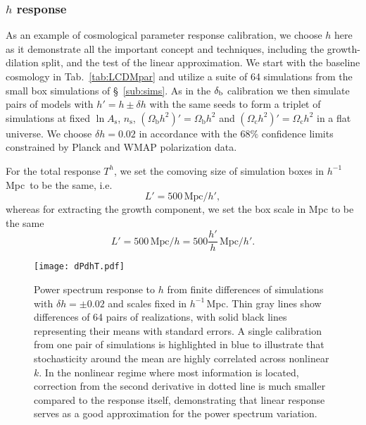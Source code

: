 \documentclass[prd,twocolumn,amsmath,amssymb,floatfix,superscriptaddress]{revtex4-1}
\newcommand{\Omegab}{{\Omega_\textrm{b}}}
\newcommand{\Omegac}{{\Omega_\textrm{c}}}
\newcommand{\lnAs}{{\ln\!A_\textrm{s}}}
\newcommand{\ns}{{n_\textrm{s}}}
\newcommand{\br}{{\rm b}}
\newcommand{\hiMpc}{$h^{-1}\,$Mpc}
\begin{document}
{{\subsubsection{$h$ response}
\label{sub:calibrations}

As an example of cosmological parameter response calibration, we choose
$h$ here as it demonstrate all the important concept and techniques,
including the growth-dilation split, and the test of the linear approximation.
We start with the baseline cosmology in Tab.~\ref{tab:LCDMpar} and  utilize a 
suite
of 64 simulations from the small box simulations of \S~\ref{sub:sims}.
As in the $\delta_\br$ {calibration}
we then simulate  pairs of 
models with  $h'= h\pm\delta h$ with the same seeds to form a triplet of simulations
at fixed  $\lnAs$, $\ns$, $(\Omegab h^2)'= \Omegab h^2$ and $(\Omegac h^2)'=
\Omegac h^2$
in a flat universe.
We choose $\delta h=0.02$ in accordance with the $68\%$ confidence limits
constrained by Planck and WMAP polarization data.


For the total response $T^h$, we set the comoving size of simulation boxes
in \hiMpc\ to be the same, i.e.
\begin{equation}
    L'=500\,\textrm{Mpc}/h',
\end{equation}
whereas for extracting the growth component, we set the box scale in Mpc to be the
same
\begin{equation}
    L'=500\,\textrm{Mpc}/h=500\frac{h'}{h}\,\textrm{Mpc}/h'.
\end{equation}

\begin{figure}[tb]
    \centering
    \texttt{[image: dPdhT.pdf]}
    \caption{
        \footnotesize Power spectrum response to $h$ from finite differences of
        simulations with $\delta h=\pm0.02$ and scales fixed in \hiMpc.
        Thin gray lines show differences of 64 pairs of realizations,
        with solid black lines representing their means with standard errors.
        A single calibration from one pair of simulations is highlighted in blue
        to illustrate that stochasticity around the mean are highly correlated across nonlinear $k$.
        In the nonlinear regime where most information is located,
        correction from the second derivative in dotted line
        is much smaller compared to the response itself,
        demonstrating that linear response serves as a good approximation for the
        power spectrum variation.
    }
    \label{fig:dPdhT}
\end{figure}


}}
\end{document}
